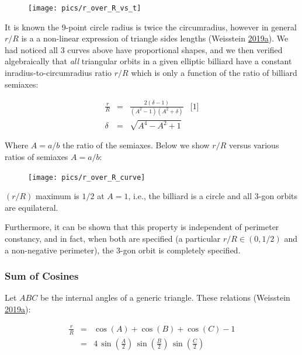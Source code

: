 \documentclass[]{article}
\begin{document}
\begin{figure}[H]

{\centering \texttt{[image: pics/r\_over\_R\_vs\_t]} 

}

\end{figure}

It is known the 9-point circle radius is twice the circumradius, however in general \(r/R\) is a a non-linear expression of triangle sides lengths (Weisstein \protect\hyperlink{ref-mw}{2019}\protect\hyperlink{ref-mw}{a}). We had noticed all 3 curves above have proportional shapes, and we then verified algebraically that \emph{all} triangular orbits in a given elliptic billiard have a constant inradius-to-circumradius ratio \(r/R\) which is only a function of the ratio of billiard semiaxes:

\[
\begin{array}{rcll}
\frac{r}{R}&=&\frac{2(\delta-1)}{(A^2-1)(A^2+\delta)}&\mbox{[1]}\\
\delta&=&\sqrt{A^4-A^2+1}
\end{array}
\]

Where \(A=a/b\) the ratio of the semiaxes. Below we show \(r/R\) versus various ratios of semiaxes \(A=a/b\):

\begin{figure}[H]

{\centering \texttt{[image: pics/r\_over\_R\_curve]} 

}

\end{figure}

\((r/R)\) maximum is \(1/2\) at \(A=1\), i.e., the billiard is a circle and all 3-gon orbits are equilateral.

Furthermore, it can be shown that this property is independent of perimeter constancy, and in fact, when both are specified (a particular \(r/R\in (0,1/2)\) and a non-negative perimeter), the 3-gon orbit is completely specified.

\hypertarget{sum-of-cosines}{%
\subsubsection{Sum of Cosines}\label{sum-of-cosines}}

Let \(ABC\) be the internal angles of a generic triangle. These relations (Weisstein \protect\hyperlink{ref-mw}{2019}\protect\hyperlink{ref-mw}{a}):

\[
\begin{array}{ccc}
\frac{r}{R} & = & \cos(A)+\cos(B)+\cos(C)-1 \\[10pt]
            & = & 4\,\sin(\frac{A}{2})\,\sin(\frac{B}{2})\,\sin(\frac{C}{2})
\end{array}
\]
\end{document}
